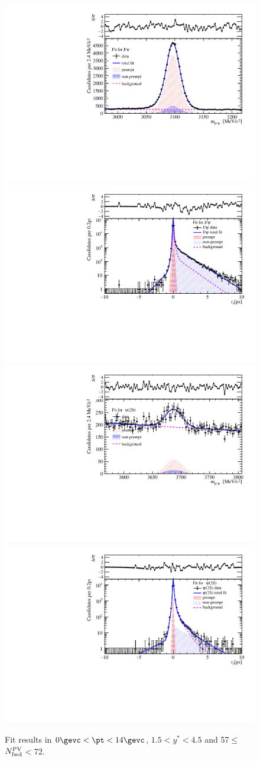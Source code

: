 \begin{figure}[H]
\begin{center}
\includegraphics[width=0.45\linewidth]{pdf/Pbp/FWorkdir/TwoDimFit/ProjMass/Jpsi_n4y1pt1.pdf}
\includegraphics[width=0.45\linewidth]{pdf/Pbp/FWorkdir/TwoDimFit/ProjTz/Jpsi_n4y1pt1.pdf}
\vspace*{-0.5cm}
\includegraphics[width=0.45\linewidth]{pdf/Pbp/FWorkdir/TwoDimFit/ProjMass/Psi2S_n4y1pt1.pdf}
\includegraphics[width=0.45\linewidth]{pdf/Pbp/FWorkdir/TwoDimFit/ProjTz/Psi2S_n4y1pt1.pdf}
\vspace*{-0.5cm}
\end{center}
\caption{Fit results in $0\gevc<\pt<14\gevc$, $1.5<y^*<4.5$ and 57$\leq$$N_{\rm fwd}^{\rm PV}$$<$72.}
\end{figure}
